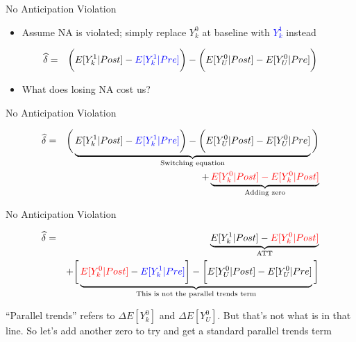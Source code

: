 \documentclass{beamer}
\begin{document}
\begin{frame}{No Anticipation Violation}

\begin{itemize}
\item Assume NA is violated; simply replace $Y^0_k$ at baseline with \textcolor{blue}{$Y^1_k$} instead
\end{itemize}


\begin{eqnarray*}
\widehat{\delta} &=& \bigg ( E[Y^1_k|Post] - \textcolor{blue}{E[Y^1_k|Pre]} \bigg ) - \bigg ( E[Y^0_U | Post ] - E[ Y^0_U | Pre] \bigg) \\
\end{eqnarray*}

\begin{itemize}
\item What does losing NA cost us?
\end{itemize}


\end{frame}


\begin{frame}{No Anticipation Violation}

\begin{eqnarray*}
\widehat{\delta} &=& \bigg ( \underbrace{E[Y^1_k|Post] - \textcolor{blue}{E[Y^1_k|Pre] }\bigg ) - \bigg ( E[Y^0_U | Post ] - E[ Y^0_U | Pre]}_{\mathclap{\text{Switching equation}}} \bigg)  \\
&&+ \underbrace{\textcolor{red}{E[Y_k^0 |Post] - E[Y^0_k | Post]}}_{\mathclap{\text{Adding zero}}} 
\end{eqnarray*}


\end{frame}

\begin{frame}{No Anticipation Violation}

\begin{eqnarray*}
\widehat{\delta} &=& \underbrace{E[Y^1_k | Post] - \textcolor{red}{E[Y^0_k | Post]}}_{\mathclap{\text{ATT}}} \\
&& + \bigg [  \underbrace{\textcolor{red}{E[Y^0_k | Post]} - \textcolor{blue}{E[Y^1_k | Pre]} \bigg ] - \bigg [ \textcolor{black}{E[Y^0_U | Post]} - E[Y_U^0 | Pre] }_{\mathclap{\text{This is not the parallel trends term}}} \bigg ]
\end{eqnarray*}

``Parallel trends'' refers to  $\Delta E[Y^0_k]$ and $\Delta E[Y^0_U]$.  But that's not what is in that line.  So let's add another zero to try and get a standard parallel trends term

\end{frame}
\end{document}
